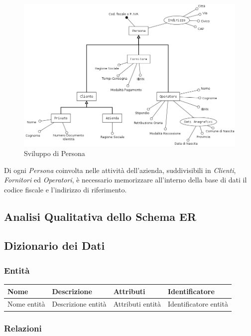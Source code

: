 			\begin{figure}[H]
				\centering
				\includegraphics[width=12cm]{images/finitures/persona.png}
				\caption{Sviluppo di Persona}
				\label{fig:persona}
			\end{figure}
			
			Di ogni \emph{Persona} coinvolta nelle attività dell'azienda, suddivisibili in \emph{Clienti}, \emph{Fornitori} ed \emph{Operatori}, è necessario memorizzare all'interno della base di dati il codice fiscale e l'indirizzo di riferimento.		

	
	\subsection{Analisi Qualitativa dello Schema ER}
	
	\subsection{Dizionario dei Dati}
		
		\subsubsection{Entità}
		
			\begin{longtable}{| p{2.5cm} | p{4.5cm} | p{2cm} | p{2.5cm} |}
				\hline
				
					\textbf{Nome} & \textbf{Descrizione} & \textbf{Attributi} & \textbf{Identificatore} \\ \hline
					
					Nome entità & 
					Descrizione entità & 
					Attributi entità & 
					Identificatore entità
					\\
					
				\hline
			\end{longtable}
		
		\subsubsection{Relazioni}